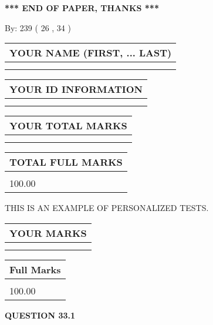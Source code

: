 \documentclass[12pt]{article}
\begin{document}
 

 
\vspace{0.3in}
   
   
 \vspace{0.2in}
 
   
   
   
   
\vspace{1.0in} 
{\textbf{\large{ *** END OF PAPER, THANKS *** }}} 
   
   
\hspace{1.0in} By: 
         239 (          26 ,           34 )
   
   
   
   
\newpage 
\setcounter{page}{ 
    33001 } 
   
   
   
   
\noindent\begin{tabular}{|l|}
\hline
YOUR NAME (FIRST, ... LAST)  \\
\hline
 \\ 
 \\ 
\hline
\end{tabular}
\hspace{0.05in} \begin{tabular}{|l|}
\hline
 YOUR   ID   INFORMATION  \\
\hline
 \\ 
 \\ 
\hline
\end{tabular}
   
   
\vspace{0.2in}\noindent\begin{tabular}{|l|}
\hline
YOUR TOTAL MARKS  \\
\hline
 \\ 
 \\ 
\hline
\end{tabular}
\hspace{0.05in} \begin{tabular}{|l|}
\hline
TOTAL FULL MARKS  \\
\hline
 \\ 
100.00 \\
\hline
\end{tabular}
   
   
 \vspace{0.2in}
{\Huge  THIS IS AN EXAMPLE OF}
{\Huge  PERSONALIZED TESTS. }
   
   
  
\vspace{0.2in}
  
\noindent\begin{tabular}{|l|}
\hline
 YOUR MARKS  \\
\hline
 \\ 
 \\ 
\hline
\end{tabular}
\hspace{0.05in} \begin{tabular}{|l|}
\hline
 Full Marks  \\
\hline
 \\ 
100.00 \\
\hline
\end{tabular}
{\textbf{\Large{QUESTION
33.1 
}}}
  
\end{document}
